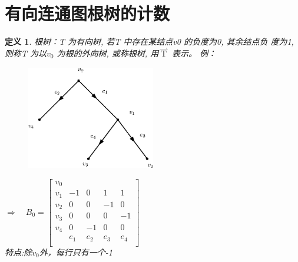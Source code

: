 \documentclass[11pt,a4paper,openany]{book}
\newcommand{\hwxw}{\CJKfamily{hwxw}}
\newtheorem{defination}{\textbf{定义}}[section]
\begin{document}
\section{有向连通图根树的计数}
\begin{defination}
根树：T 为有向树, 若T 中存在某结点v0 的负度为0, 其余结点负
度为1, 则称T 为以$v_0$ 为根的外向树, 或称根树, 用$\mathop{T}\limits^{\rightharpoonup}$ 表示。
例：
\begin{figure}[H]
  \centering
  \includegraphics[width=0.5\textwidth]{3_6.eps}\\
  \caption*{}
\end{figure}
$\Rightarrow \quad B_0=\left[
                         \begin{array}{ccccc}
                           v_0 &  &  &  &  \\
                           v_1& -1 & 0 & 1 & 1\\
                           v_2 & 0 & 0 & -1 & 0 \\
                           v_3 & 0 & 0 & 0& -1 \\
                           v_4 & 0 & -1 & 0 & 0 \\
                          & e_1  & e_2 & e_3 & e_4 \\
                         \end{array}
                       \right]
$\\
{\hwxw 特点:除$v_0$外，每行只有一个-1}\\

\end{defination}
\end{document}
